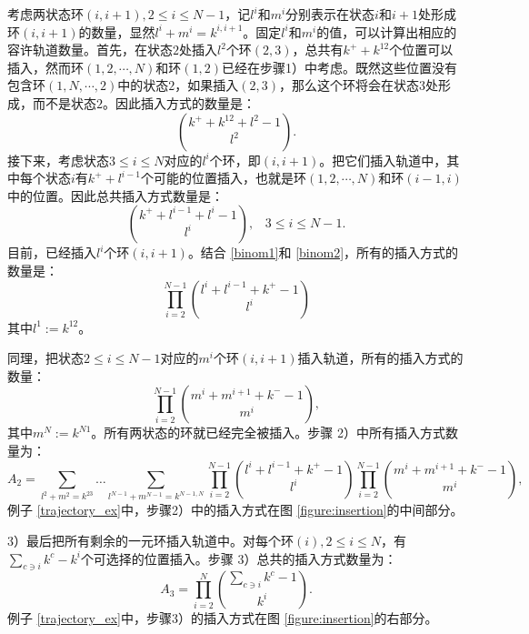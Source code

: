 考虑两状态环$(i, i+1), 2\leqslant i \leqslant N-1$，记$l^i$和$m^i$分别表示在状态$i$和$i+1$处形成环$(i, i+1)$的数量，显然$l^i + m^i = k^{i, i+1}$。固定$l^i$和$m^i$的值，可以计算出相应的容许轨道数量。首先，在状态$2$处插入$l^2$个环$(2, 3)$，总共有$k^+ + k^{12}$个位置可以插入，然而环$(1,2, \cdots, N)$和环$(1, 2)$已经在步骤1）中考虑。既然这些位置没有包含环$(1, N, \cdots, 2)$中的状态$2$，如果插入$(2,3)$，那么这个环将会在状态$3$处形成，而不是状态$2$。因此插入方式的数量是：
\begin{equation} \label{binom1}
    \binom{k^++k^{12}+l^{2}-1}{l^{2}}.
\end{equation}
接下来，考虑状态$3 \leqslant i \leqslant N$对应的$l^i$个环，即$(i, i+1)$。把它们插入轨道中，其中每个状态$i$有$k^+ + l^{i-1}$个可能的位置插入，也就是环$(1, 2, \cdots, N)$和环$(i-1, i)$中的位置。因此总共插入方式数量是：
\begin{equation} \label{binom2}
    \binom{k^++l^{i-1}+l^{i}-1}{l^{i}},\;\;\;3\le i\le N-1.
\end{equation}
目前，已经插入$l^i$个环$(i,i+1)$。结合 \ref{binom1}和 \ref{binom2}，所有的插入方式的数量是：
\begin{equation*}
    \prod_{i=2}^{N-1}\binom{l^{i}+l^{i-1}+k^{+}-1}{l^{i}}
\end{equation*}
其中$l^1:=k^{12}$。

同理，把状态$2 \leqslant i \leqslant N-1$对应的$m^i$个环$(i, i+1)$插入轨道，所有的插入方式的数量：
\begin{equation*}
    \prod_{i=2}^{N-1}\binom{m^{i}+m^{i+1}+k^{-}-1}{m^{i}},
\end{equation*}
其中$m^N:=k^{N1}$。所有两状态的环就已经完全被插入。步骤 2）中所有插入方式数量为：
\begin{equation*}
    A_2 = \sum_{l^{2}+m^{2}=k^{23}}\dots\sum_{l^{N-1}+m^{N-1}=k^{N-1,N}}
    \prod_{i=2}^{N-1}\binom{l^{i}+l^{i-1}+k^{+}-1}{l^{i}}\prod_{i=2}^{N-1}\binom{m^{i}+m^{i+1}+k^{-}-1}{m^{i}},
\end{equation*}
例子 \ref{trajectory_ex}中，步骤2）中的插入方式在图 \ref{figure:insertion}的中间部分。

3）最后把所有剩余的一元环插入轨道中。对每个环$(i), 2 \leqslant i \leqslant N$，有$\sum_{c\ni i}k^c-k^i$个可选择的位置插入。步骤 3）总共的插入方式数量为：
\begin{equation*}\label{formula:A3}
    A_3 = \prod_{i=2}^N\binom{\sum_{c\ni i}k^{c}-1}{k^{i}}.
\end{equation*}
例子 \ref{trajectory_ex}中，步骤3）的插入方式在图 \ref{figure:insertion}的右部分。

